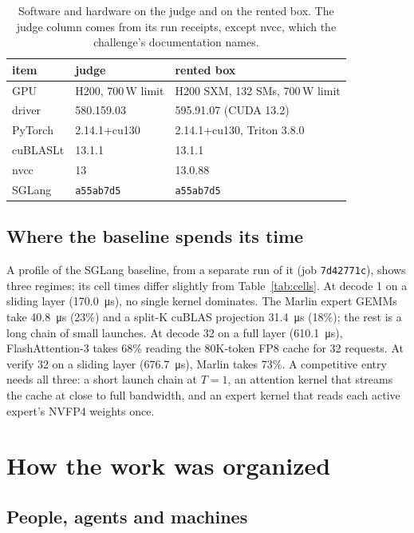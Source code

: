 \documentclass[11pt]{article}
\begin{document}
\begin{table}[t]
\centering
\caption{Software and hardware on the judge and on the rented box. The judge
column comes from its run receipts, except nvcc, which the challenge's
documentation names.}
\label{tab:env}
\small
\begin{tabular}{lll}
\toprule
item & judge & rented box\\
\midrule
GPU & H200, 700\,W limit & H200 SXM, 132 SMs, 700\,W limit\\
driver & 580.159.03 & 595.91.07 (CUDA 13.2)\\
PyTorch & 2.14.1+cu130 & 2.14.1+cu130, Triton 3.8.0\\
cuBLASLt & 13.1.1 & 13.1.1\\
nvcc & 13 & 13.0.88\\
SGLang & \texttt{a55ab7d5} & \texttt{a55ab7d5}\\
\bottomrule
\end{tabular}
\end{table}

\subsection{Where the baseline spends its time}

A profile of the SGLang baseline, from a separate run of it (job
\texttt{7d42771c}), shows three regimes; its cell times differ slightly from
Table~\ref{tab:cells}. At decode 1 on a sliding
layer (\SI{170.0}{\micro\second}), no single kernel dominates. The Marlin expert
GEMMs take \SI{40.8}{\micro\second} (23\%) and a split-K cuBLAS projection
\SI{31.4}{\micro\second} (18\%); the rest is a long chain of small launches. At
decode 32 on a full layer (\SI{610.1}{\micro\second}), FlashAttention-3 takes 68\%
reading the 80K-token FP8 cache for 32 requests. At verify 32 on a sliding layer
(\SI{676.7}{\micro\second}), Marlin takes 73\%. A competitive entry needs all
three: a short launch chain at $T=1$, an attention kernel that streams the cache
at close to full bandwidth, and an expert kernel that reads each active expert's
NVFP4 weights once.

\section{How the work was organized}

\subsection{People, agents and machines}
\end{document}
